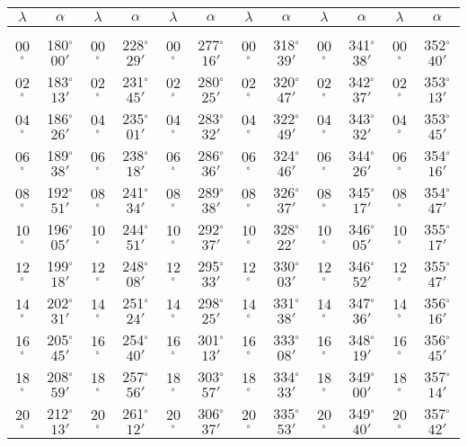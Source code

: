 \begin{table}
{\begin{tabular}{cc|cc|cc|cc|cc|cc}
$\lambda$& $\alpha$& $\lambda$& $\alpha$& $\lambda$& $\alpha$& $\lambda$& $\alpha$& $\lambda$& $\alpha$& $\lambda$& $\alpha$\\\hline
&&&&&&&&&&&\\[-2ex]
00$^\circ$ & 180$^\circ$$00'$ & 00$^\circ$ & 228$^\circ$$29'$ & 00$^\circ$ & 277$^\circ$$16'$ & 00$^\circ$ & 318$^\circ$$39'$ &  00$^\circ$ & 341$^\circ$$38'$ & 00$^\circ$ & 352$^\circ$$40'$\\
02$^\circ$ & 183$^\circ$$13'$ & 02$^\circ$ & 231$^\circ$$45'$ & 02$^\circ$ & 280$^\circ$$25'$ & 02$^\circ$ & 320$^\circ$$47'$ &  02$^\circ$ & 342$^\circ$$37'$ & 02$^\circ$ & 353$^\circ$$13'$\\
04$^\circ$ & 186$^\circ$$26'$ & 04$^\circ$ & 235$^\circ$$01'$ & 04$^\circ$ & 283$^\circ$$32'$ & 04$^\circ$ & 322$^\circ$$49'$ &  04$^\circ$ & 343$^\circ$$32'$ & 04$^\circ$ & 353$^\circ$$45'$\\
06$^\circ$ & 189$^\circ$$38'$ & 06$^\circ$ & 238$^\circ$$18'$ & 06$^\circ$ & 286$^\circ$$36'$ & 06$^\circ$ & 324$^\circ$$46'$ &  06$^\circ$ & 344$^\circ$$26'$ & 06$^\circ$ & 354$^\circ$$16'$\\
08$^\circ$ & 192$^\circ$$51'$ & 08$^\circ$ & 241$^\circ$$34'$ & 08$^\circ$ & 289$^\circ$$38'$ & 08$^\circ$ & 326$^\circ$$37'$ &  08$^\circ$ & 345$^\circ$$17'$ & 08$^\circ$ & 354$^\circ$$47'$\\
10$^\circ$ & 196$^\circ$$05'$ & 10$^\circ$ & 244$^\circ$$51'$ & 10$^\circ$ & 292$^\circ$$37'$ & 10$^\circ$ & 328$^\circ$$22'$ &  10$^\circ$ & 346$^\circ$$05'$ & 10$^\circ$ & 355$^\circ$$17'$\\
12$^\circ$ & 199$^\circ$$18'$ & 12$^\circ$ & 248$^\circ$$08'$ & 12$^\circ$ & 295$^\circ$$33'$ & 12$^\circ$ & 330$^\circ$$03'$ &  12$^\circ$ & 346$^\circ$$52'$ & 12$^\circ$ & 355$^\circ$$47'$\\
14$^\circ$ & 202$^\circ$$31'$ & 14$^\circ$ & 251$^\circ$$24'$ & 14$^\circ$ & 298$^\circ$$25'$ & 14$^\circ$ & 331$^\circ$$38'$ &  14$^\circ$ & 347$^\circ$$36'$ & 14$^\circ$ & 356$^\circ$$16'$\\
16$^\circ$ & 205$^\circ$$45'$ & 16$^\circ$ & 254$^\circ$$40'$ & 16$^\circ$ & 301$^\circ$$13'$ & 16$^\circ$ & 333$^\circ$$08'$ &  16$^\circ$ & 348$^\circ$$19'$ & 16$^\circ$ & 356$^\circ$$45'$\\
18$^\circ$ & 208$^\circ$$59'$ & 18$^\circ$ & 257$^\circ$$56'$ & 18$^\circ$ & 303$^\circ$$57'$ & 18$^\circ$ & 334$^\circ$$33'$ &  18$^\circ$ & 349$^\circ$$00'$ & 18$^\circ$ & 357$^\circ$$14'$\\
20$^\circ$ & 212$^\circ$$13'$ & 20$^\circ$ & 261$^\circ$$12'$ & 20$^\circ$ & 306$^\circ$$37'$ & 20$^\circ$ & 335$^\circ$$53'$ &  20$^\circ$ & 349$^\circ$$40'$ & 20$^\circ$ & 357$^\circ$$42'$\\

\end{tabular}}
\end{table}
